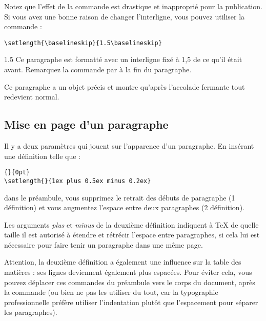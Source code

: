 
Notez que l'effet de la commande  est drastique et
inapproprié pour la publication. Si vous avez une bonne raison de
changer l'interligne, vous pouvez utiliser la commande :
\pagebreak[3]%
\begin{lscommand}
\verb|\setlength{\baselineskip}{1.5\baselineskip}|
\end{lscommand}

\begin{example}
{\setlength{\baselineskip}%
           {1.5\baselineskip}
Ce paragraphe est formatté avec
un interligne fixé à 1,5 de ce
qu'il était avant. Remarquez la
commande par à la fin du
paragraphe.\par}

Ce paragraphe a un objet précis
et montre qu'après l'accolade
fermante tout redevient normal.
\end{example}

\subsection{Mise en page d'un paragraphe}\label{parsp}

Il y a deux paramètres qui jouent sur l'apparence d'un paragraphe. En
insérant une définition telle que :
\begin{code}
\verb|{|\verb|}{0pt}| \\
\verb|\setlength{|\verb|}{1ex plus 0.5ex minus 0.2ex}|
\end{code}
dans le préambule, vous supprimez le retrait des débuts de paragraphe
(1\iere{} définition) et vous augmentez l'espace entre deux paragraphes
(2\ieme{} définition).

Les arguments \emph{plus} et \emph{minus} de la deuxième définition
indiquent à \TeX{} de quelle taille il est autorisé à étendre et
rétrécir l'espace entre paragraphes, si cela lui est nécessaire pour
faire tenir un paragraphe dans une même page.

Attention, la deuxième définition a également une influence sur la
table des matières : ses lignes deviennent également plus
espacées. Pour éviter cela, vous pouvez déplacer ces commandes du
préambule vers le corps du document, après la commande
 (ou bien ne pas les utiliser du tout, car la
typographie professionnelle préfère utiliser l'indentation plutôt que
l'espacement pour séparer les paragraphes).

